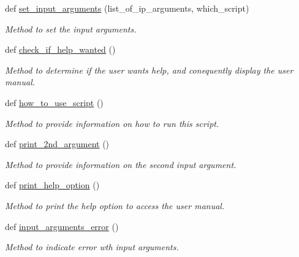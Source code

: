 \begin{DoxyCompactItemize}
def \hyperlink{classutilities_1_1queue__ip__arguments_1_1queue__ip__args_a4c536970af155ee6cc2c2886b145f807}{set\+\_\+input\+\_\+arguments} (list\+\_\+of\+\_\+ip\+\_\+arguments, which\+\_\+script)
\begin{DoxyCompactList}\small\item\em Method to set the input arguments. \end{DoxyCompactList}\item 
def \hyperlink{classutilities_1_1queue__ip__arguments_1_1queue__ip__args_a1a87ae4035acfa51fe1d1aff53f770f3}{check\+\_\+if\+\_\+help\+\_\+wanted} ()
\begin{DoxyCompactList}\small\item\em Method to determine if the user wants help, and conequently display the user manual. \end{DoxyCompactList}\item 
def \hyperlink{classutilities_1_1queue__ip__arguments_1_1queue__ip__args_a5fecd33a91d20f19acba2fb1b8d1a60e}{how\+\_\+to\+\_\+use\+\_\+script} ()
\begin{DoxyCompactList}\small\item\em Method to provide information on how to run this script. \end{DoxyCompactList}\item 
def \hyperlink{classutilities_1_1queue__ip__arguments_1_1queue__ip__args_a6311efe4f2f6ac8c64c9b442e8854ab7}{print\+\_\+2nd\+\_\+argument} ()
\begin{DoxyCompactList}\small\item\em Method to provide information on the second input argument. \end{DoxyCompactList}\item 
def \hyperlink{classutilities_1_1queue__ip__arguments_1_1queue__ip__args_a28c79307da87e28e9ac3467290fd5738}{print\+\_\+help\+\_\+option} ()
\begin{DoxyCompactList}\small\item\em Method to print the help option to access the user manual. \end{DoxyCompactList}\item 
def \hyperlink{classutilities_1_1queue__ip__arguments_1_1queue__ip__args_afdfbfffba8afb5e786283dd22d856e93}{input\+\_\+arguments\+\_\+error} ()
\begin{DoxyCompactList}\small\item\em Method to indicate error wth input arguments. \end{DoxyCompactList}\item 

\end{DoxyCompactItemize}
